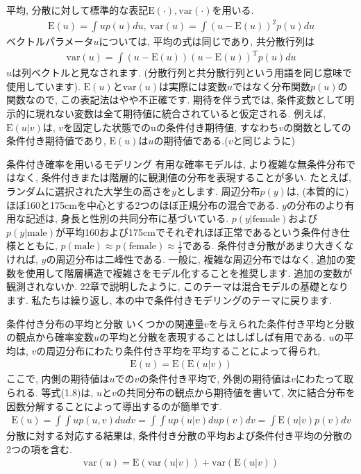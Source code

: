 \documentclass[10pt,dvipdfmx,a4]{beamer}
\newcommand{\eq}[1]{\begin{align}#1\end{align}}
\newcommand{\eqn}[1]{\begin{align*}#1\end{align*}}
\begin{document}
\begin{frame}
平均, 分散に対して標準的な表記$\text{E}(\cdot), \text{var}(\cdot)$を用いる.
\eqn{\text{E}(u)=\int u p(u)du,\ \text{var}(u)=\int (u-\text{E}(u))^2 p(u)du}
ベクトルパラメータ$u$については, 平均の式は同じであり, 共分散行列は
\eqn{\text{var}(u)=\int (u-\text{E}(u))(u-\text{E}(u))^{\mathrm{T}}p(u)du}
$u$は列ベクトルと見なされます.
(分散行列と共分散行列という用語を同じ意味で使用しています).
$\text{E}(u)$と$\text{var}(u)$は実際には変数$u$ではなく分布関数$p(u)$の関数なので, この表記法はやや不正確です.
期待を伴う式では, 条件変数として明示的に現れない変数は全て期待値に統合されていると仮定される.
例えば, $\text{E}(u|v)$は, $v$を固定した状態でのuの条件付き期待値, すなわち$v$の関数としての条件付き期待値であり, $\text{E}(u)$は$u$の期待値である.($v$と同じように)
\end{frame}


\begin{frame}{条件付き確率を用いるモデリング}
有用な確率モデルは, より複雑な無条件分布ではなく, 条件付きまたは階層的に観測値の分布を表現することが多い.
たとえば, ランダムに選択された大学生の高さを$y$とします.
周辺分布$p(y)$は, (本質的に)ほぼ160と175cmを中心とする2つのほぼ正規分布の混合である.
$y$の分布のより有用な記述は, 身長と性別の共同分布に基づいている.
$p(y|\text{female})$および$p(y|\text{male})$が平均160および175cmでそれぞれほぼ正常であるという条件付き仕様とともに, $p(\text{male})\approx p(\text{female})\approx \tfrac{1}{2}$である.
条件付き分散があまり大きくなければ, $y$の周辺分布は二峰性である.
一般に, 複雑な周辺分布ではなく, 追加の変数を使用して階層構造で複雑さをモデル化することを推奨します.
追加の変数が観測されないか.
22章で説明したように, このテーマは混合モデルの基礎となります.
私たちは繰り返し, 本の中で条件付きモデリングのテーマに戻ります.
\end{frame}


\begin{frame}{条件付き分布の平均と分散}
いくつかの関連量$v$を与えられた条件付き平均と分散の観点から確率変数$u$の平均と分散を表現することはしばしば有用である.
$u$の平均は, $v$の周辺分布にわたり条件付き平均を平均することによって得られ,
\eq{\text{E}(u)=\text{E}(\text{E}(u|v))}
ここで, 内側の期待値は$u$での$v$の条件付き平均で, 外側の期待値は$v$にわたって取られる.
等式(1.8)は, $u$と$v$の共同分布の観点から期待値を書いて, 次に結合分布を因数分解することによって導出するのが簡単です.
\eqn{\text{E}(u)=\int \int u p(u,v)dudv=\int \int up(u|v)dup(v)dv=\int\text{E}(u|v)p(v)dv}
分散に対する対応する結果は, 条件付き分散の平均および条件付き平均の分散の2つの項を含む.
\eq{\text{var}(u)=\text{E}(\text{var}(u|v))+\text{var}(\text{E}(u|v))}
\end{frame}
\end{document}
